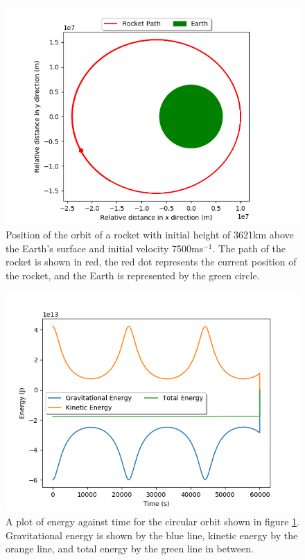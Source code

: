 \documentclass[twocolumn,prl,nobalancelastpage,aps,10pt]{revtex4-1}
\begin{document}
\begin{figure}[ht]
	\includegraphics*[width=0.96\linewidth,clip]{ellipticalDefault}
	\caption{Position of the orbit of a rocket with initial height of 3621km above the Earth's surface and initial velocity 7500ms$^{-1}$. The path of the rocket is shown in red, the red dot represents the current position of the rocket, and the Earth is represented by the green circle.} \label{elDefFig}
\end{figure}

\begin{figure}[ht]
	\includegraphics*[width=0.96\linewidth,clip]{ellipticalDefaultEnergy}
	\caption{A plot of energy against time for the circular orbit shown in figure \ref{elDefFig}. Gravitational energy is shown by the blue line, kinetic energy by the orange line, and total energy by the green line in between.} \label{elDefEn}
\end{figure}
\end{document}
